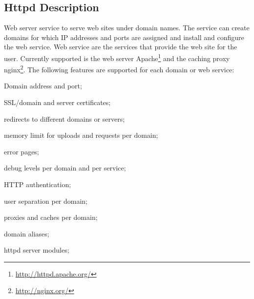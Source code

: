 \subsection{Httpd Description}

Web server service to serve web sites under domain names. The service
can create domains for which IP addresses and ports are assigned and install
and configure the web service. Web service are the services that provide
the web site for the user. 
Currently supported is the web server
Apache\footnote{\url{http://httpd.apache.org/}} and the caching proxy
nginx\footnote{\url{http://nginx.org/}}.
The following features are supported for each
domain or web service:

\begin{asparaitem}
\item Domain address and port;
\item SSL/domain and server certificates;
\item redirects to different domains or servers;
\item memory limit for uploads and requests per domain;
\item error pages;
\item debug levels per domain and per service;
\item HTTP authentication;
\item user separation per domain;
\item proxies and caches per domain;
\item domain aliases;
\item httpd server modules;
\end{asparaitem}
